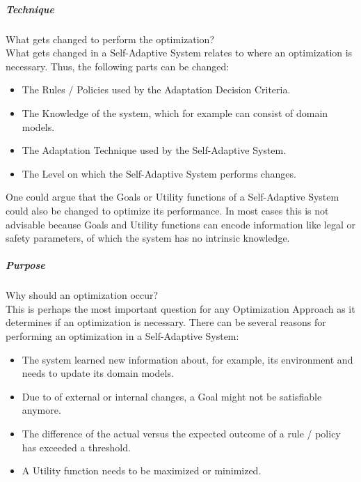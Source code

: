 \subparagraph*{Technique}
What gets changed to perform the optimization? \\
What gets changed in a Self-Adaptive System relates to where an optimization is necessary.
Thus, the following parts can be changed:
\begin{itemize}
    \item The Rules / Policies used by the Adaptation Decision Criteria.
    \item The Knowledge of the system, which for example can consist of domain models.
    \item The Adaptation Technique used by the Self-Adaptive System.
    \item The Level on which the Self-Adaptive System performs changes.
\end{itemize}
One could argue that the Goals or Utility functions of a Self-Adaptive System could also be changed to optimize its performance.
In most cases this is not advisable because Goals and Utility functions can encode information
like legal or safety parameters, of which the system has no intrinsic knowledge.

\subparagraph*{Purpose}
Why should an optimization occur? \\
This is perhaps the most important question for any Optimization Approach as it determines if an optimization is necessary.
There can be several reasons for performing an optimization in a Self-Adaptive System:
\begin{itemize}
    \item The system learned new information about, for example, its environment and needs to update its domain models.
    \item Due to of external or internal changes, a Goal might not be satisfiable anymore.
    \item The difference of the actual versus the expected outcome of a rule / policy has exceeded a threshold.
    \item A Utility function needs to be maximized or minimized.
\end{itemize}

